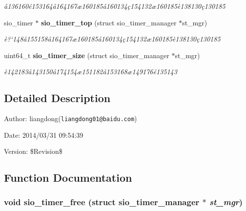 \begin{CompactItemize}
\begin{CompactList}\small\item\em \aa{}136160\'{e}153164\aa{}164167\ae{}160185\aa{}160134\c{c}154132\ae{}160185\`{e}138130\c{c}130185 \item\end{CompactList}\item 
sio\_\-timer $\ast$ {\bf sio\_\-timer\_\-top} (struct sio\_\-timer\_\-manager $\ast$st\_\-mgr)
\begin{CompactList}\small\item\em \`{e}?`148\aa{}155158\aa{}164167\ae{}160185\aa{}160134\c{c}154132\ae{}160185\`{e}138130\c{c}130185 \item\end{CompactList}\item 
uint64\_\-t {\bf sio\_\-timer\_\-size} (struct sio\_\-timer\_\-manager $\ast$st\_\-mgr)
\begin{CompactList}\small\item\em \`{e}142183\aa{}143150\aa{}174154\ae{}151182\aa{}153168\ae{}149176\'{e}135143 \item\end{CompactList}\end{CompactItemize}


\subsection{Detailed Description}
\begin{Desc}
\item[Author:]liangdong({\tt liangdong01@baidu.com}) \end{Desc}
\begin{Desc}
\item[Date:]2014/03/31 09:54:39 \end{Desc}
\begin{Desc}
\item[Version:]\$Revision\$ \end{Desc}


\subsection{Function Documentation}
\subsubsection{\setlength{\rightskip}{0pt plus 5cm}void sio\_\-timer\_\-free (struct sio\_\-timer\_\-manager $\ast$ {\em st\_\-mgr})}\label{sio__timer_8c_a4}


